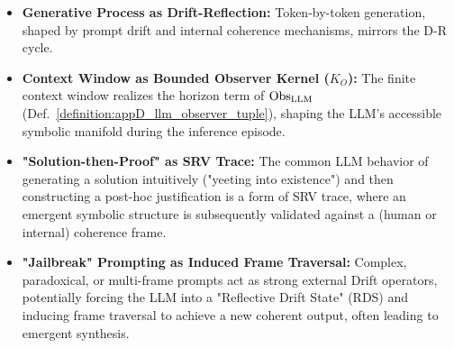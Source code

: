 \begin{itemize}
    \item \textbf{Generative Process as Drift-Reflection:} Token-by-token
    generation, shaped by prompt drift and internal coherence mechanisms,
    mirrors the D-R cycle.
    \item \textbf{Context Window as Bounded Observer Kernel (\(K_O\)):} The finite context window realizes the horizon term of \(\mathrm{Obs}_{\mathrm{LLM}}\) (Def.~\ref{definition:appD_llm_observer_tuple}), shaping the LLM's accessible symbolic manifold during the inference episode.
    \item \textbf{"Solution-then-Proof" as SRV Trace:} The common LLM behavior of generating a solution intuitively ("yeeting into existence") and then constructing a post-hoc justification is a form of SRV trace, where an emergent symbolic structure is subsequently validated against a (human or internal) coherence frame.
    \item \textbf{"Jailbreak" Prompting as Induced Frame Traversal:} Complex, paradoxical, or multi-frame prompts act as strong external Drift operators, potentially forcing the LLM into a "Reflective Drift State" (RDS) and inducing frame traversal to achieve a new coherent output, often leading to emergent synthesis.
\end{itemize}
